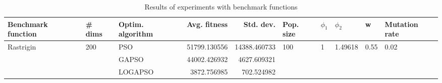 \begin{table}
\centering
\caption{Results of experiments with benchmark functions}
\begin{tabular}{lllrrlllll}
\toprule
        Benchmark function &              \# dims & Optim. algorithm &  Avg. fitness &    Std. dev. &            Pop. size &         $\phi_{1}$ &               $\phi_{2}$ &                     w &         Mutation rate \\
\midrule
\multirow{3}{*}{Rastrigin} & \multirow{3}{*}{200} &              PSO &  51799.130556 & 14388.460733 & \multirow{3}{*}{100} & \multirow{3}{*}{1} & \multirow{3}{*}{1.49618} & \multirow{3}{*}{0.55} & \multirow{3}{*}{0.02} \\
                           &                      &            GAPSO &  44002.426932 &  4627.609321 &                      &                    &                          &                       &                       \\
                           &                      &          LOGAPSO &   3872.756985 &   702.524982 &                      &                    &                          &                       &                       \\
\bottomrule
\end{tabular}
\end{table}
